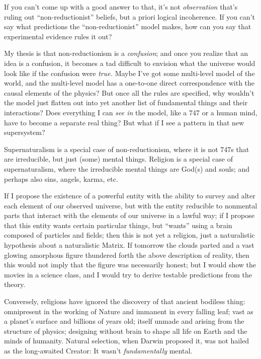 {
 If you can't come up with a good answer to that,
it's not \textit{observation} that's
ruling out ``non-reductionist''
beliefs, but a priori logical incoherence. If you can't
say what predictions the
``non-reductionist'' model makes,
how can you say that experimental evidence rules it out?}

{
 My thesis is that non-reductionism is a \textit{confusion}; and
once you realize that an idea is a confusion, it becomes a tad
difficult to envision what the universe would look like if the
confusion were \textit{true.} Maybe I've got some
multi-level model of the world, and the multi-level model has a
one-to-one direct correspondence with the causal elements of the
physics? But once all the rules are specified, why
wouldn't the model just flatten out into yet another
list of fundamental things and their interactions? Does everything I
can \textit{see in} the model, like a 747 or a human mind, have to
become a separate real thing? But what if I see a pattern in that new
supersystem?}

{
 Supernaturalism is a special case of non-reductionism, where it is
not 747s that are irreducible, but just (some) mental things. Religion
is a special case of supernaturalism, where the irreducible mental
things are God(s) and souls; and perhaps also sins, angels, karma,
etc.}

{
 If I propose the existence of a powerful entity with the ability
to survey and alter each element of our observed universe, but with the
entity reducible to nonmental parts that interact with the elements of
our universe in a lawful way; if I propose that this entity wants
certain particular things, but
``wants'' using a brain composed of
particles and fields; then this is not yet a religion, just a
naturalistic hypothesis about a naturalistic Matrix. If tomorrow the
clouds parted and a vast glowing amorphous figure thundered forth the
above description of reality, then this would not imply that the figure
was necessarily honest; but I would show the movies in a science class,
and I would try to derive testable predictions from the theory.}

{
 Conversely, religions have ignored the discovery of that ancient
bodiless thing: omnipresent in the working of Nature and immanent in
every falling leaf; vast as a planet's surface and
billions of years old; itself unmade and arising from the structure of
physics; designing without brain to shape all life on Earth and the
minds of humanity. Natural selection, when Darwin proposed it, was not
hailed as the long-awaited Creator: It wasn't
\textit{fundamentally} mental.}

